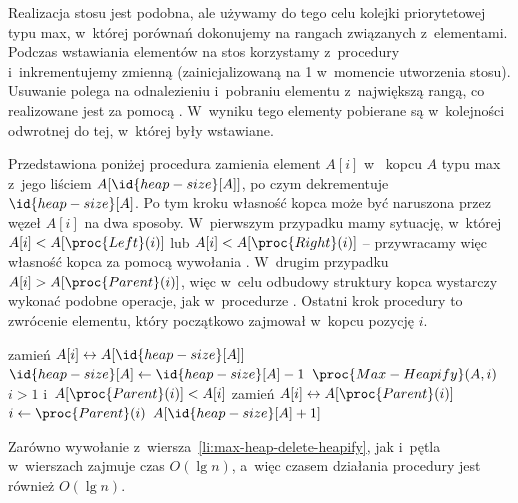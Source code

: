 Realizacja stosu jest podobna, ale używamy do tego celu kolejki priorytetowej typu max, w~której porównań dokonujemy na rangach związanych z~elementami. Podczas wstawiania elementów na stos korzystamy z~procedury  i~inkrementujemy zmienną  (zainicjalizowaną na 1 w~momencie utworzenia stosu). Usuwanie polega na odnalezieniu i~pobraniu elementu z~największą rangą, co realizowane jest za pomocą . W~wyniku tego elementy pobierane są w~kolejności odwrotnej do tej, w~której były wstawiane.

\exercise %

\noindent Przedstawiona poniżej procedura  zamienia element $A[i]$ w~ kopcu $A$ typu max z~jego liściem $A[\id{heap-size}[A]]$, po czym dekrementuje $\id{heap-size}[A]$. Po tym kroku własność kopca może być naruszona przez węzeł $A[i]$ na dwa sposoby. W~pierwszym przypadku mamy sytuację, w~której $A[i]<A[\proc{Left}(i)]$ lub $A[i]<A[\proc{Right}(i)]$ -- przywracamy więc własność kopca za pomocą wywołania . W~drugim przypadku $A[i]>A[\proc{Parent}(i)]$, więc w~celu odbudowy struktury kopca wystarczy wykonać podobne operacje, jak w~procedurze . Ostatni krok procedury to zwrócenie elementu, który początkowo zajmował w~kopcu pozycję $i$.
\begin{codebox}
\li	zamień $A[i]\leftrightarrow A[\id{heap-size}[A]]$
\li	$\id{heap-size}[A]\gets\id{heap-size}[A]-1$
\li	$\proc{Max-Heapify}(A,i)$ \label{li:max-heap-delete-heapify}
\li	\While $i>1$ i~$A[\proc{Parent}(i)]<A[i]$ \label{li:max-heap-delete-while-begin}
\li		\Do
			zamień $A[i]\leftrightarrow A[\proc{Parent}(i)]$
\li			$i\gets\proc{Parent}(i)$
		\End \label{li:max-heap-delete-while-end}
\li	\Return $A[\id{heap-size}[A]+1]$
\end{codebox}

Zarówno wywołanie z~wiersza~\ref{li:max-heap-delete-heapify}, jak i~pętla  w~wierszach \twodashes{\ref{li:max-heap-delete-while-begin}}{\ref{li:max-heap-delete-while-end}} zajmuje czas $O(\lg n)$, a~więc czasem działania procedury  jest również $O(\lg n)$.

